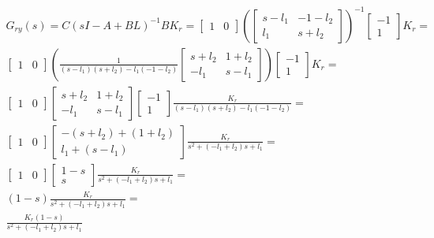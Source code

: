 \documentclass[a4paper]{article}
\begin{document}
\begin{align*}
  G_{ry}(s) = C(sI - A + BL)^{-1}BK_r = \begin{bmatrix}1 & 0\end{bmatrix} \left(\begin{bmatrix}s - l_1 & -1 -l_2 \\ l_1 & s + l_2\end{bmatrix} \right)^{-1} \begin{bmatrix}-1 \\ 1\end{bmatrix} K_r = \\
  \begin{bmatrix}1 & 0\end{bmatrix} \left(\frac{1}{(s-l_1)(s+l_2) - l_1(-1-l_2)}\begin{bmatrix}s + l_2 & 1 +l_2 \\ -l_1 & s - l_1\end{bmatrix} \right) \begin{bmatrix}-1 \\ 1\end{bmatrix} K_r = \\
  \begin{bmatrix}1 & 0\end{bmatrix} \begin{bmatrix}s + l_2 & 1 +l_2 \\ -l_1 & s - l_1\end{bmatrix} \begin{bmatrix}-1 \\ 1\end{bmatrix} \frac{K_r}{(s-l_1)(s+l_2) - l_1(-1-l_2)} = \\
  \begin{bmatrix}1 & 0\end{bmatrix} \begin{bmatrix}-(s + l_2) + (1 +l_2) \\ l_1 + (s - l_1)\end{bmatrix} \frac{K_r}{s^2 + (-l_1 + l_2)s + l_1} = \\
  \begin{bmatrix}1 & 0\end{bmatrix} \begin{bmatrix}1 - s \\ s\end{bmatrix} \frac{K_r}{s^2 + (-l_1 + l_2)s + l_1} = \\
  (1 - s) \frac{K_r}{s^2 + (-l_1 + l_2)s + l_1} = \\
  \frac{K_r(1 - s)}{s^2 + (-l_1 + l_2)s + l_1}
\end{align*}
\end{document}
